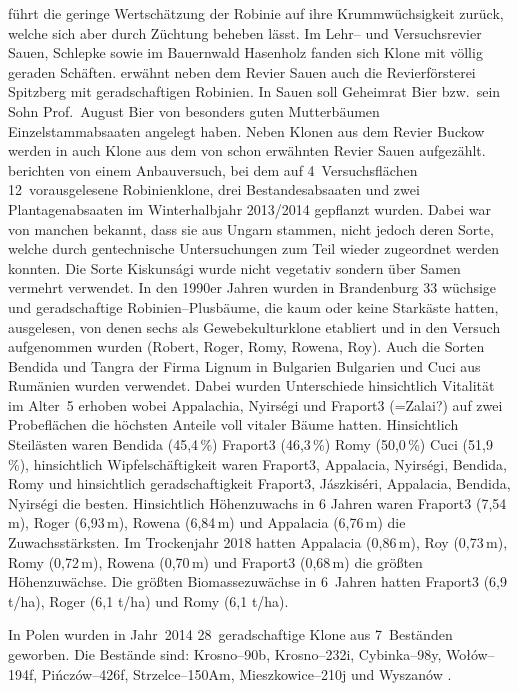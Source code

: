\documentclass[twocolumn]{scrartcl}
\begin{document}
\citet{schroeck1953robine} führt die geringe Wertschätzung der Robinie
auf ihre Krummwüchsigkeit zurück, welche sich aber durch Züchtung
beheben lässt. Im Lehr-- und Versuchsrevier Sauen, Schlepke sowie im
Bauernwald Hasenholz fanden sich Klone mit völlig geraden
Schäften. \citet{erteld1952robinieErtrag} erwähnt neben dem
Revier Sauen auch die Revierförsterei Spitzberg mit geradschaftigen Robinien.
In Sauen soll Geheimrat Bier bzw.\ sein Sohn Prof.\ August Bier 
von besonders guten Mutterbäumen Einzelstammabsaaten angelegt haben.
Neben Klonen aus dem Revier Buckow werden in
\citet{naujoks2005robinie} auch Klone aus dem von
\citet{schroeck1953robine} schon erwähnten Revier Sauen aufgezählt.
\citet{naujoks2005robinie,hofmann2020robinie,lange2021robinie,lange2022robinie}
berichten von einem Anbauversuch, bei dem auf 4~Versuchsflächen
12~vorausgelesene Robinienklone, drei Bestandesabsaaten und zwei
Plantagenabsaaten im Winterhalbjahr 2013/2014 gepflanzt wurden. Dabei
war von manchen bekannt, dass sie aus Ungarn stammen, nicht jedoch
deren Sorte, welche durch gentechnische Untersuchungen zum Teil wieder
zugeordnet werden konnten. Die Sorte Kiskunsági wurde nicht vegetativ
sondern über Samen vermehrt verwendet. In den 1990er Jahren wurden in
Brandenburg 33 wüchsige und geradschaftige Robinien--Plusbäume, die
kaum oder keine Starkäste hatten, ausgelesen, von denen sechs als
Gewebekulturklone etabliert und in den Versuch aufgenommen wurden
(Robert, Roger, Romy, Rowena, Roy). Auch die Sorten Bendida und Tangra
der Firma Lignum in Bulgarien Bulgarien und Cuci aus Rumänien wurden
verwendet. Dabei wurden Unterschiede hinsichtlich Vitalität im Alter~5
erhoben wobei Appalachia, Nyirségi und Fraport3 (=Zalai?) auf zwei
Probeflächen die höchsten Anteile voll vitaler Bäume
hatten. Hinsichtlich Steilästen waren Bendida (45,4\,\%) Fraport3
(46,3\,\%) Romy (50,0\,\%) Cuci (51,9\,\%), hinsichtlich
Wipfelschäftigkeit waren Fraport3, Appalacia, Nyirségi, Bendida, Romy
und hinsichtlich geradschaftigkeit Fraport3, Jászkiséri, Appalacia,
Bendida, Nyirségi die besten.  Hinsichtlich Höhenzuwachs in 6 Jahren
waren Fraport3 (7,54\,m), Roger (6,93\,m), Rowena (6,84\,m) und
Appalacia (6,76\,m) die Zuwachsstärksten. Im Trockenjahr 2018 hatten
Appalacia (0,86\,m), Roy (0,73\,m), Romy (0,72\,m), Rowena (0,70\,m)
und Fraport3 (0,68\,m) die größten Höhenzuwächse.  Die größten
Biomassezuwächse in 6~Jahren hatten Fraport3 (6,9 t/ha), Roger (6,1
t/ha) und Romy (6,1 t/ha).

In Polen wurden in Jahr~2014 28~geradschaftige Klone aus 7~Beständen
geworben. Die Bestände sind: Krosno--90b, Krosno--232i, Cybinka--98y,
Wołów--194f, Pińczów--426f, Strzelce--150Am, Mieszkowice--210j und
Wyszanów \citep{wojda2015robiniePolen}.
\end{document}
